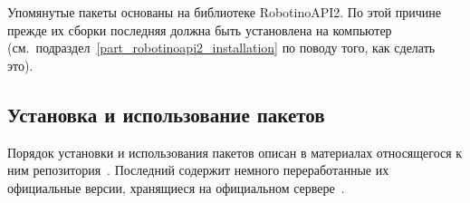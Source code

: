 Упомянутые пакеты основаны на библиотеке RobotinoAPI2.
По этой причине прежде их сборки последняя должна быть установлена на компьютер (см.~подраздел~\ref{part_robotinoapi2_installation} по поводу того, как сделать это).


\subsection{Установка и использование пакетов}
Порядок установки и использования пакетов описан в материалах относящегося к ним репозитория~\cite{robotino}.
Последний содержит немного переработанные их официальные версии, хранящиеся на официальном сервере~\cite{official_packages}.
